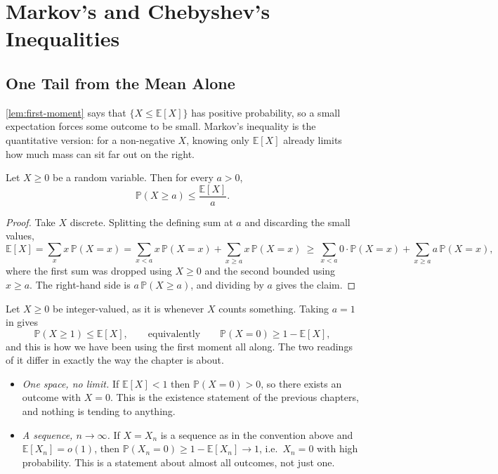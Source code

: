 \section{Markov's and Chebyshev's Inequalities}\label{sec:markov-chebyshev}

\subsection{One Tail from the Mean Alone}

\autoref{lem:first-moment} says that \(\{X \le \mathbb{E}[X]\}\) has positive probability, so a small expectation forces some outcome to be small. Markov's inequality is the quantitative version: for a non-negative \(X\), knowing only \(\mathbb{E}[X]\) already limits how much mass can sit far out on the right.

\begin{theorem}\label{thm:markov}
    Let \(X \ge 0\) be a random variable. Then for every \(a > 0\),
    \[
        \mathbb{P}(X \ge a) \le \frac{\mathbb{E}[X]}{a}.
    \]
\end{theorem}

\begin{proof}
    Take \(X\) discrete. Splitting the defining sum at \(a\) and discarding the small values,
    \[
        \mathbb{E}[X]
        = \sum_{x} x \, \mathbb{P}(X = x)
        = \sum_{x < a} x \, \mathbb{P}(X = x) + \sum_{x \ge a} x \, \mathbb{P}(X = x)
        \ \ge\ \sum_{x < a} 0 \cdot \mathbb{P}(X = x) + \sum_{x \ge a} a \, \mathbb{P}(X = x),
    \]
    where the first sum was dropped using \(X \ge 0\) and the second bounded using \(x \ge a\). The right-hand side is \(a \, \mathbb{P}(X \ge a)\), and dividing by \(a\) gives the claim.
\end{proof}

\begin{eg}\label{eg:markov-first-moment}
    Let \(X \ge 0\) be integer-valued, as it is whenever \(X\) counts something. Taking \(a = 1\) in  gives
    \[
        \mathbb{P}(X \ge 1) \le \mathbb{E}[X],
        \qquad\text{equivalently}\qquad
        \mathbb{P}(X = 0) \ge 1 - \mathbb{E}[X],
    \]
    and this is how we have been using the first moment all along. The two readings of it differ in exactly the way the chapter is about.
    \begin{itemize}
        \item \emph{One space, no limit.} If \(\mathbb{E}[X] < 1\) then \(\mathbb{P}(X = 0) > 0\), so there exists an outcome with \(X = 0\). This is the existence statement of the previous chapters, and nothing is tending to anything.
        \item \emph{A sequence, \(n \to \infty\).} If \(X = X_n\) is a sequence as in the convention above and \(\mathbb{E}[X_n] = o(1)\), then \(\mathbb{P}(X_n = 0) \ge 1 - \mathbb{E}[X_n] \to 1\), i.e.\ \(X_n = 0\) with high probability. This is a statement about almost all outcomes, not just one.
    \end{itemize}
\end{eg}

